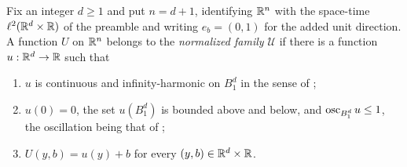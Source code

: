 \begin{definition}
Fix an integer $d\ge1$ and put $n=d+1$, identifying $\mathbb{R}^n$ with the space-time
$\ell^2(\mathbb{R}^d\times\mathbb{R})$ of the preamble and writing $e_b=(0,1)$ for the added
unit direction. A function $U$ on $\mathbb{R}^n$ belongs to the \emph{normalized family
$\mathcal U$} if there is a function $u:\mathbb{R}^d\to\mathbb{R}$ such that
\begin{enumerate}
\item $u$ is continuous and infinity-harmonic on $B_1^d$ in the sense of
;
\item $u(0)=0$, the set $u(B_1^d)$ is bounded above and below, and
$\operatorname{osc}_{B_1^d}u\le1$, the oscillation being that of ;
\item $U(y,b)=u(y)+b$ for every $(y,b)\in\mathbb{R}^d\times\mathbb{R}$.
\end{enumerate}
\end{definition}
